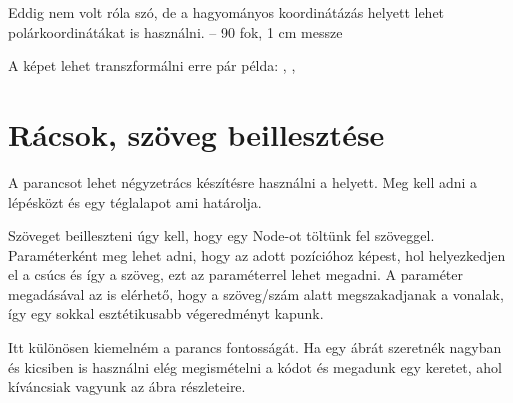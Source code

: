Eddig nem volt róla szó, de a hagyományos koordinátázás helyett lehet polárkoordinátákat is használni.  -- 90 fok, 1 cm messze

A képet lehet transzformálni erre pár példa: , , 

\begin{tikzExample}
\end{tikzExample}

\section{Rácsok, szöveg beillesztése}

A  parancsot lehet négyzetrács készítésre használni a \code{\foreach} helyett. Meg kell adni a lépésközt és egy téglalapot ami határolja.

Szöveget beilleszteni úgy kell, hogy egy Node-ot töltünk fel szöveggel. Paraméterként meg lehet adni, hogy az adott pozícióhoz képest, hol helyezkedjen el a csúcs és így a szöveg, ezt az  paraméterrel lehet megadni. A  paraméter megadásával az is elérhető, hogy a szöveg/szám alatt megszakadjanak a vonalak, így egy sokkal esztétikusabb végeredményt kapunk. 

Itt különösen kiemelném a \code{\clip} parancs fontosságát. Ha egy ábrát szeretnék nagyban és kicsiben is használni elég megismételni a kódot és megadunk egy keretet, ahol kíváncsiak vagyunk az ábra részleteire. 

